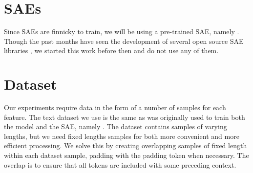 
\section{SAEs}
Since SAEs are finnicky to train, we will be using a pre-trained SAE, namely .
Though the past months have seen the development of several open source SAE libraries , we started this work before then and do not use any of them.

\section{Dataset}
Our experiments require data in the form of a number of samples for each feature.
The text dataset we use is the same as was originally used to train both the model and the SAE, namely .
The dataset contains samples of varying lengths, but we need fixed lengths samples for both more convenient and more efficient processing.
We solve this by creating overlapping samples of fixed length within each dataset sample, padding with the padding token when necessary.
The overlap is to ensure that all tokens are included with some preceding context.

